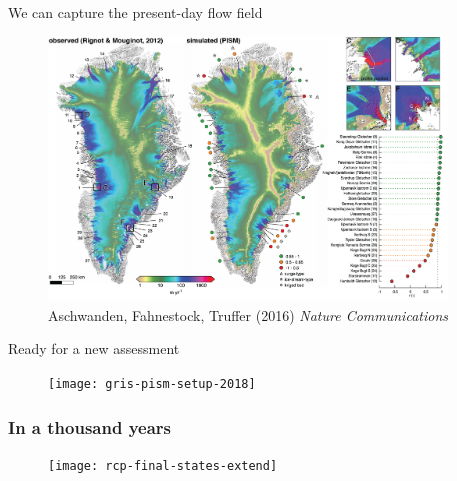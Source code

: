 \documentclass[hide notes,intlimits]{beamer}
\begin{document}
\begin{frame}{We can capture the present-day flow field}
  \begin{figure}
    \includegraphics[height=7cm]{greenland-overview-3}
    \\ \scriptsize{Aschwanden, Fahnestock, Truffer (2016) \textit{Nature Communications}}
  \end{figure}
\end{frame}

\begin{frame}{Ready for a new assessment}
  \begin{figure}
    \texttt{[image: gris-pism-setup-2018]}
  \end{figure}
\end{frame}


\begin{frame}
  \frametitle{In a thousand years}
  \begin{figure}
    \texttt{[image: rcp-final-states-extend]}
  \end{figure}

\end{frame}
\end{document}
